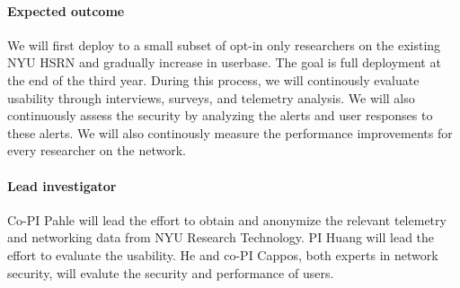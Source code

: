 \paragraph{Expected outcome} We will first deploy to a small subset of opt-in only researchers on the existing NYU HSRN and gradually increase in userbase. The goal is full deployment at the end of the third year. During this process, we will continously evaluate usability through interviews, surveys, and telemetry analysis. We will also continuously assess the security by analyzing the alerts and user responses to these alerts. We will also continously measure the performance improvements for every researcher on the network.

\paragraph{Lead investigator} Co-PI Pahle will lead the effort to obtain and anonymize the relevant telemetry and networking data from NYU Research Technology. PI Huang will lead the effort to evaluate the usability. He and co-PI Cappos, both experts in network security, will evalute the security and performance of users.
